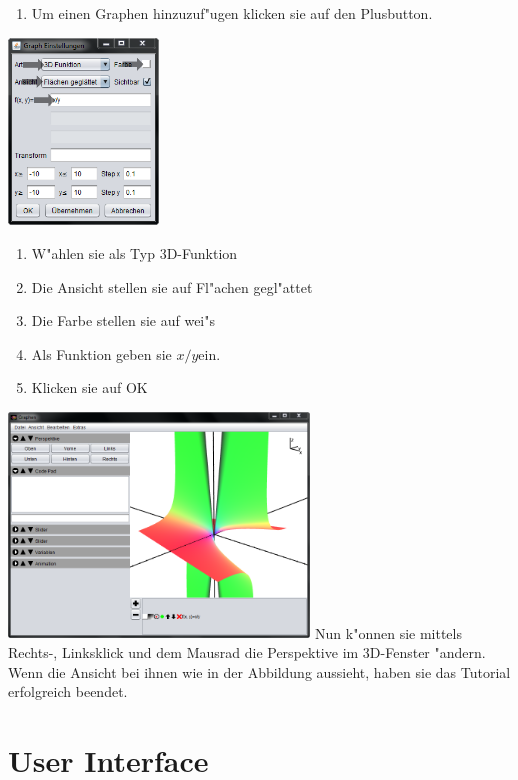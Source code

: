 \documentclass{scrartcl}
\begin{document}
\begin{enumerate}
\item  Um einen Graphen hinzuzuf"ugen klicken sie auf den Plusbutton.
\end{enumerate}
\includegraphics[width=0.3\textwidth]{images/tutorial/graph.png}
\begin{enumerate}
\item W"ahlen sie als Typ 3D-Funktion
\item Die Ansicht stellen sie auf Fl"achen gegl"attet
\item Die Farbe stellen sie auf wei"s
\item Als Funktion geben sie \glqq \(x/y\)\grqq  ein.
\item Klicken sie auf OK
\end{enumerate}
\includegraphics[width=0.6\textwidth]{images/tutorial/interface3.png}\newline
Nun k"onnen sie mittels Rechts-, Linksklick und dem Mausrad die Perspektive im 3D-Fenster "andern. Wenn die Ansicht bei ihnen wie in der Abbildung aussieht, haben sie das Tutorial erfolgreich beendet.\newline
\newpage
\section{User Interface}
\end{document}
